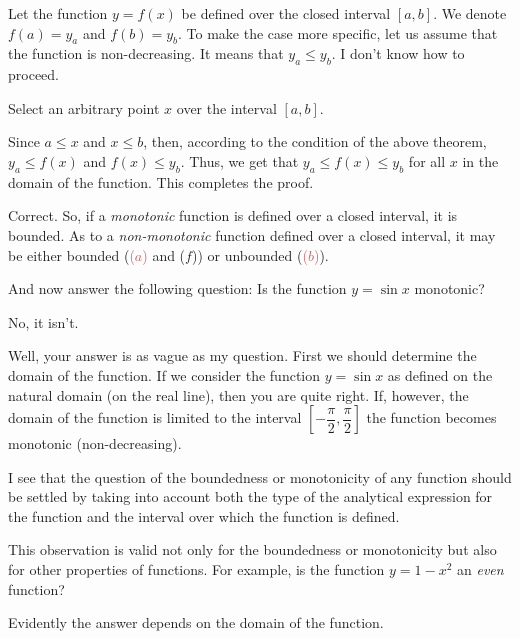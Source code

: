 {\rdr Let the function $y = f (x)$ be defined over the closed interval $[a, b]$. We denote $f (a) = y_{a}$ and $f (b) = y_{b}$. To make the case more specific, let us assume that the function is non-decreasing. It means that $y_{a} \leqslant y_{b}$. I don't know how to proceed.

\athr Select an arbitrary point $x$ over the interval $[a, b]$.

\rdr Since $a \leqslant x$ and $x \leqslant b$, then, according to the condition of the above theorem, $y_{a} \leqslant f(x)$ and $f(x) \leqslant y_{b}$. Thus, we get that $y_{a}  \leqslant f(x) \leqslant y_{b} $ for all $x$ in the domain of the function. This completes the proof. 

\athr Correct. So, if a \emph{monotonic} function is defined over a closed interval, it is bounded. As to a \emph{non-monotonic} function defined over a closed interval, it may be either
bounded (\textcolor{IndianRed}{($a$)} and ($f$)) or unbounded (\textcolor{IndianRed}{($b$)}). 

And now answer the following question: Is the function $y = \sin x$ monotonic? 

\rdr No, it isn't. 

\athr Well, your answer is as vague as my question. First we should determine the domain of the function. If we consider the function $y = \sin x$ as defined on the natural domain (on the real line), then you are quite right. If, however, the domain of the function is limited to the interval $\left[-\dfrac{\pi}{2}, \dfrac{\pi}{2} \right]$ the function becomes monotonic (non-decreasing).

\rdr I see that the question of the boundedness or monotonicity of any function should be settled by taking into account both the type of the analytical expression for the function and the interval over which the function is defined.

\athr This observation is valid not only for the boundedness or monotonicity but also for other properties of functions. For example, is the function $y = 1 - x^{2}$ an \emph{even} function?

\rdr Evidently the answer depends on the domain of the function.

}
